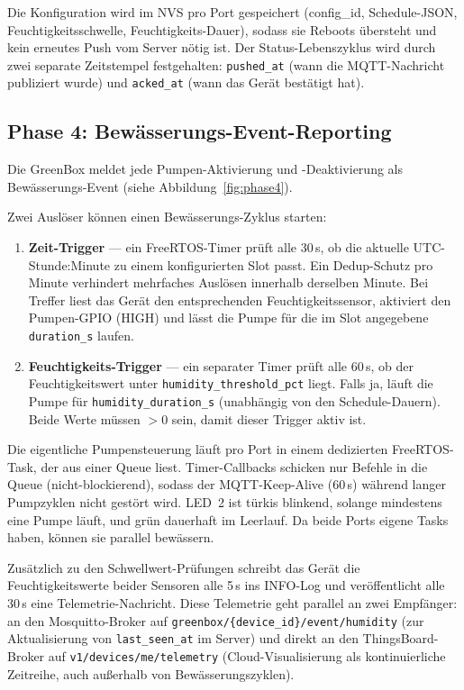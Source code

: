 \documentclass[a4paper,12pt]{article}
\begin{document}
Die Konfiguration wird im NVS pro Port gespeichert (config\_id,
Schedule-JSON, Feuchtigkeitsschwelle, Feuchtigkeits-Dauer), sodass
sie Reboots übersteht und kein erneutes Push vom Server nötig ist.
Der Status-Lebenszyklus wird durch zwei separate Zeitstempel
festgehalten: \texttt{pushed\_at} (wann die MQTT-Nachricht
publiziert wurde) und \texttt{acked\_at} (wann das Gerät bestätigt
hat).

\subsection{Phase 4: Bewässerungs-Event-Reporting}

Die GreenBox meldet jede Pumpen-Aktivierung und -Deaktivierung als
Bewässerungs-Event (siehe Abbildung~\ref{fig:phase4}).

Zwei Auslöser können einen Bewässerungs-Zyklus starten:

\begin{enumerate}
  \item \textbf{Zeit-Trigger} --- ein FreeRTOS-Timer prüft alle 30\,s,
        ob die aktuelle UTC-Stunde:Minute zu einem konfigurierten Slot
        passt. Ein Dedup-Schutz pro Minute verhindert mehrfaches
        Auslösen innerhalb derselben Minute. Bei Treffer liest das
        Gerät den entsprechenden Feuchtigkeitssensor, aktiviert den
        Pumpen-GPIO (HIGH) und lässt die Pumpe für die im Slot
        angegebene \texttt{duration\_s} laufen.
  \item \textbf{Feuchtigkeits-Trigger} --- ein separater Timer prüft
        alle 60\,s, ob der Feuchtigkeitswert unter
        \texttt{humidity\_threshold\_pct} liegt. Falls ja, läuft die
        Pumpe für \texttt{humidity\_duration\_s} (unabhängig von den
        Schedule-Dauern). Beide Werte müssen $>0$ sein, damit dieser
        Trigger aktiv ist.
\end{enumerate}

\noindent Die eigentliche Pumpensteuerung läuft pro Port in einem
dedizierten FreeRTOS-Task, der aus einer Queue liest. Timer-Callbacks
schicken nur Befehle in die Queue (nicht-blockierend), sodass der
MQTT-Keep-Alive (60\,s) während langer Pumpzyklen nicht gestört wird.
LED~2 ist türkis blinkend, solange mindestens eine Pumpe läuft, und
grün dauerhaft im Leerlauf. Da beide Ports eigene Tasks haben,
können sie parallel bewässern.

Zusätzlich zu den Schwellwert-Prüfungen schreibt das Gerät die
Feuchtigkeitswerte beider Sensoren alle 5\,s ins INFO-Log und
veröffentlicht alle 30\,s eine Telemetrie-Nachricht. Diese
Telemetrie geht parallel an zwei Empfänger: an den Mosquitto-Broker
auf \texttt{greenbox/\{device\_id\}/event/humidity} (zur
Aktualisierung von \texttt{last\_seen\_at} im Server) und direkt an
den ThingsBoard-Broker auf \texttt{v1/devices/me/telemetry}
(Cloud-Visualisierung als kontinuierliche Zeitreihe, auch außerhalb
von Bewässerungszyklen).
\end{document}
